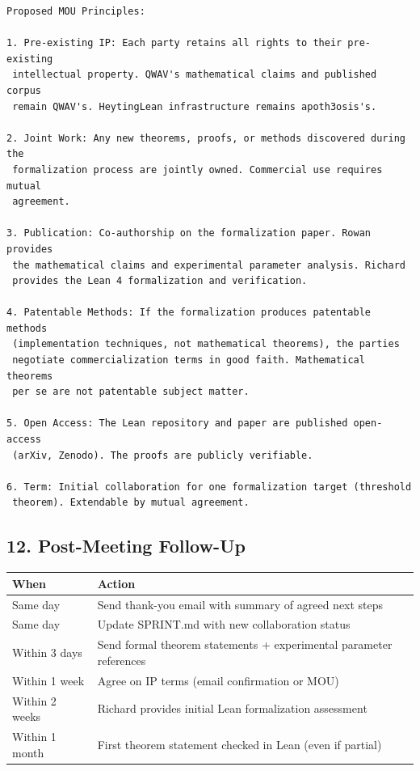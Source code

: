 \documentclass[11pt,a4paper]{article}
\begin{document}
\begin{verbatim}
Proposed MOU Principles:

1. Pre-existing IP: Each party retains all rights to their pre-existing
 intellectual property. QWAV's mathematical claims and published corpus
 remain QWAV's. HeytingLean infrastructure remains apoth3osis's.

2. Joint Work: Any new theorems, proofs, or methods discovered during the
 formalization process are jointly owned. Commercial use requires mutual
 agreement.

3. Publication: Co-authorship on the formalization paper. Rowan provides
 the mathematical claims and experimental parameter analysis. Richard
 provides the Lean 4 formalization and verification.

4. Patentable Methods: If the formalization produces patentable methods
 (implementation techniques, not mathematical theorems), the parties
 negotiate commercialization terms in good faith. Mathematical theorems
 per se are not patentable subject matter.

5. Open Access: The Lean repository and paper are published open-access
 (arXiv, Zenodo). The proofs are publicly verifiable.

6. Term: Initial collaboration for one formalization target (threshold
 theorem). Extendable by mutual agreement.
\end{verbatim}


\hrulefill


\subsection{12. Post-Meeting Follow-Up}


\begin{tabular}{|l|l|}
\hline
\textbf{When} & \textbf{Action} \\
\hline
Same day & Send thank-you email with summary of agreed next steps \\
\hline
Same day & Update SPRINT.md with new collaboration status \\
\hline
Within 3 days & Send formal theorem statements + experimental parameter references \\
\hline
Within 1 week & Agree on IP terms (email confirmation or MOU) \\
\hline
Within 2 weeks & Richard provides initial Lean formalization assessment \\
\hline
Within 1 month & First theorem statement checked in Lean (even if partial) \\
\hline
\end{tabular}
\end{document}
